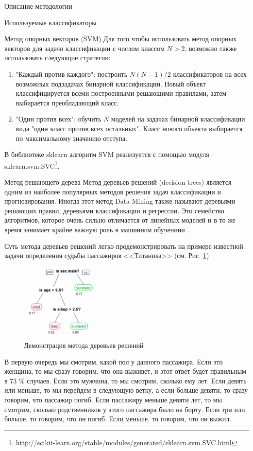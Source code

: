 \begin{section}{Описание методологии}
\begin{subsection}{Используемые классификаторы}
\begin{subsubsection}{Метод опорных векторов (SVM)}
Для того чтобы использовать метод опорных векторов для задачи классификации с числом классом $N > 2$, возможно также использовать следующие стратегии:
\begin{enumerate}
  \item "Каждый против каждого": построить $N(N-1)/2$ классификаторов на всех возможных подзадачах бинарной классификации. Новый объект классифицируется всеми построенными решающими правилами, затем выбирается преобладающий класс.
  \item "Один против всех": обучить $N$ моделей на задачах бинарной классификации вида "один класс против всех остальных". Класс нового объекта выбирается по максимальному значению отступа.
\end{enumerate}

В библиотеке sklearn алгоритм SVM реализуется с помощью модуля sklearn.svm.SVC\footnote{http://scikit-learn.org/stable/modules/generated/sklearn.svm.SVC.html}.
    \end{subsubsection}

    \begin{subsubsection}{Метод решающего дерева}
	\label{dt}
Метод деревьев решений (decision trees) является одним из наиболее популярных методов решения задач классификации и прогнозирования. Иногда этот метод Data Mining также называют деревьями решающих правил, деревьями классификации и регрессии. Это семейство алгоритмов, которое очень сильно отличается от линейных моделей и в то же время занимает крайне важную роль в машинном обучениии \cite{wiki:dt}.

Суть метода деревьев решений легко продемонстрировать на примере известной задачи определения судьбы пассажиров <<Титаника>> (см. Рис. \ref{pic:dt1})

\begin{figure}[ht!]
\centering
\includegraphics[width=0.4\textwidth]{pics/dt1}
\caption{Демонстрация метода деревьев решений}
\label{pic:dt1}
\end{figure}

 В первую очередь мы смотрим, какой пол у данного пассажира. Если это женщина, то мы сразу говорим, что она выживет, и этот ответ будет правильным в 73 \% случаев. Если это мужчина, то мы смотрим, сколько ему лет. Если девять или меньше, то мы перейдем в следующую ветку, а если больше девяти, то сразу говорим, что пассажир погиб. Если пассажиру меньше девяти лет, то мы смотрим, сколько родственников у этого пассажира было на борту. Если три или больше, то говорим, что он погиб. Если меньше, то говорим, что он выжил.


\end{subsubsection}
\end{subsection}
\end{section}
